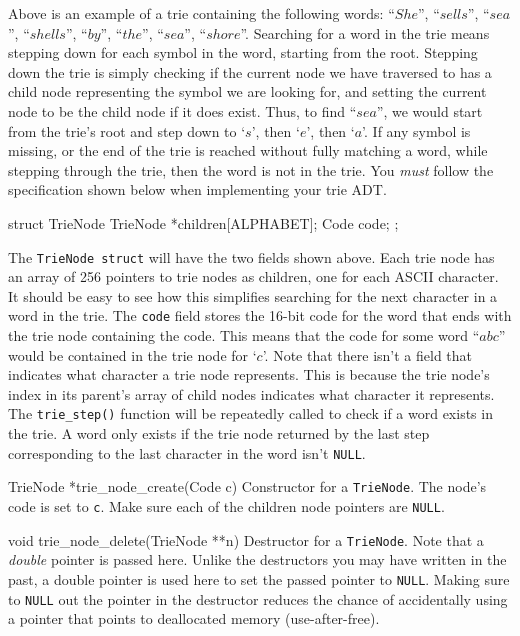 Above is an example of a trie containing the following words: ``$She$'',
``$sells$'', ``$sea$'', ``$shells$'', ``$by$'', ``$the$'', ``$sea$'',
``$shore$''. Searching for a word in the trie means stepping down for each
symbol in the word, starting from the root. Stepping down the trie is simply
checking if the current node we have traversed to has a child node representing
the symbol we are looking for, and setting the current node to be the child node
if it does exist. Thus, to find ``$sea$'', we would start from the trie's root
and step down to `$s$', then `$e$', then `$a$'.  If any symbol is missing, or
the end of the trie is reached without fully matching a word, while stepping
through the trie, then the word is not in the trie.  You \emph{must} follow the
specification shown below when implementing your trie ADT.

\begin{clisting}{}
struct TrieNode {
    TrieNode *children[ALPHABET];
    Code code;
};
\end{clisting}

The \texttt{TrieNode struct} will have the two fields shown above. Each trie
node has an array of 256 pointers to trie nodes as children, one for each ASCII
character. It should be easy to see how this simplifies searching for the next
character in a word in the trie. The \texttt{code} field stores the 16-bit code
for the word that ends with the trie node containing the code. This means that
the code for some word ``$abc$'' would be contained in the trie node for `$c$'.
Note that there isn't a field that indicates what character a trie node
represents. This is because the trie node's index in its parent's array of child
nodes indicates what character it represents. The \texttt{trie\_step()} function
will be repeatedly called to check if a word exists in the trie. A word only
exists if the trie node returned by the last step corresponding to the last
character in the word isn't \texttt{NULL}.

\begin{funcdoc}{TrieNode *trie\_node\_create(Code c)}
  Constructor for a \texttt{TrieNode}. The node's code is set to \texttt{c}.
  Make sure each of the children node pointers are \texttt{NULL}.
\end{funcdoc}

\begin{funcdoc}{void trie\_node\_delete(TrieNode **n)}
  Destructor for a \texttt{TrieNode}. Note that a \emph{double} pointer is
  passed here. Unlike the destructors you may have written in the past, a double
  pointer is used here to set the passed pointer to \texttt{NULL}. Making sure
  to \texttt{NULL} out the pointer in the destructor reduces the chance of
  accidentally using a pointer that points to deallocated memory
  (use-after-free).
\end{funcdoc}

